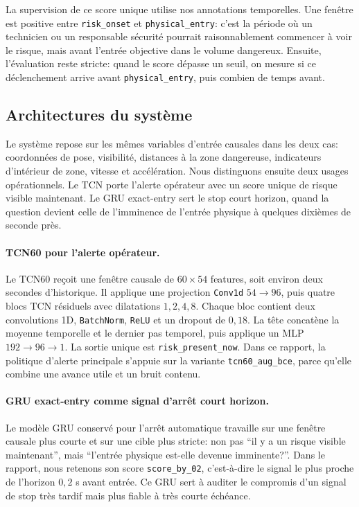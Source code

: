 \documentclass[11pt]{article}
\begin{document}
La supervision de ce score unique utilise nos annotations temporelles. Une fenêtre est positive entre \texttt{risk\_onset} et \texttt{physical\_entry}: c'est la période où un technicien ou un responsable sécurité pourrait raisonnablement commencer à voir le risque, mais avant l'entrée objective dans le volume dangereux. Ensuite, l'évaluation reste stricte: quand le score dépasse un seuil, on mesure si ce déclenchement arrive avant \texttt{physical\_entry}, puis combien de temps avant.

\subsection{Architectures du système}
Le système repose sur les mêmes variables d'entrée causales dans les deux cas: coordonnées de pose, visibilité, distances à la zone dangereuse, indicateurs d'intérieur de zone, vitesse et accélération. Nous distinguons ensuite deux usages opérationnels. Le TCN porte l'alerte opérateur avec un score unique de risque visible maintenant. Le GRU exact-entry sert le stop court horizon, quand la question devient celle de l'imminence de l'entrée physique à quelques dixièmes de seconde près.

\paragraph{TCN60 pour l'alerte opérateur.}
Le TCN60 reçoit une fenêtre causale de $60 \times 54$ features, soit environ deux secondes d'historique. Il applique une projection \texttt{Conv1d} $54 \rightarrow 96$, puis quatre blocs TCN résiduels avec dilatations $1,2,4,8$. Chaque bloc contient deux convolutions 1D, \texttt{BatchNorm}, \texttt{ReLU} et un dropout de $0,18$. La tête concatène la moyenne temporelle et le dernier pas temporel, puis applique un MLP $192 \rightarrow 96 \rightarrow 1$. La sortie unique est \texttt{risk\_present\_now}. Dans ce rapport, la politique d'alerte principale s'appuie sur la variante \texttt{tcn60\_aug\_bce}, parce qu'elle combine une avance utile et un bruit contenu.

\paragraph{GRU exact-entry comme signal d'arrêt court horizon.}
Le modèle GRU conservé pour l'arrêt automatique travaille sur une fenêtre causale plus courte et sur une cible plus stricte: non pas ``il y a un risque visible maintenant'', mais ``l'entrée physique est-elle devenue imminente?''. Dans le rapport, nous retenons son score \texttt{score\_by\_02}, c'est-à-dire le signal le plus proche de l'horizon $0,2$ s avant entrée. Ce GRU sert à auditer le compromis d'un signal de stop très tardif mais plus fiable à très courte échéance.
\end{document}
